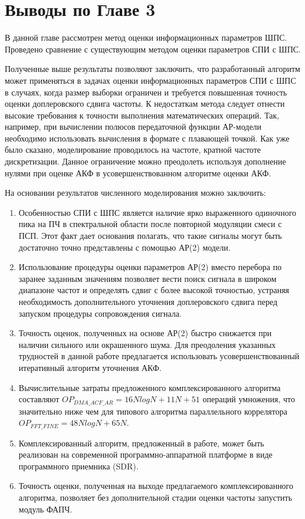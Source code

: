\section{Выводы по Главе 3}

В данной главе рассмотрен метод оценки информационных параметров ШПС. Проведено сравнение с существующим методом оценки параметров СПИ с ШПС.

Полученные выше результаты позволяют заключить, что разработанный алгоритм может применяться в задачах оценки информационных параметров СПИ с ШПС в случаях, когда размер выборки ограничен и
требуется повышенная точность оценки доплеровского сдвига частоты. К недостаткам метода следует отнести высокие требования к точности выполнения математических операций.
Так, например, при вычислении полюсов передаточной функции АР-модели необходимо использовать вычисления в формате с плавающей точкой. 
Как уже было сказано, моделирование проводилось на частоте, кратной частоте дискретизации. Данное ограничение можно преодолеть используя дополнение нулями при оценке АКФ
в усовершенствованном алгоритме оценки АКФ.

На основании результатов численного моделирования можно заключить:
\begin{enumerate}
\item Особенностью СПИ с ШПС является наличие ярко выраженного одиночного пика на ПЧ в спектральной области после повторной модуляции смеси с ПСП.
	Этот факт дает основания полагать, что такие сигналы могут быть достаточно точно представлены с помощью АР(2) модели.
\item Использование процедуры оценки параметров АР(2) вместо перебора по заранее заданным значениям позволяет вести поиск сигнала в широком диапазоне частот и определять сдвиг
	с более высокой точностью, устраняя необходимость дополнительного уточнения доплеровского сдвига перед запуском процедуры сопровождения сигнала.
\item Точность оценок, полученных на основе АР(2) быстро снижается при наличии сильного или окрашенного шума. Для преодоления указанных трудностей в 
	данной работе предлагается использовать усовершенствованный итеративный алгоритм уточнения АКФ.
\item Вычислительные затраты предложенного комплексированного алгоритма составляют ${OP_{DMA\_ACF\_AR} = 16NlogN + 11N + 51}$  операций умножения, что значительно ниже чем  для
	типового алгоритма параллельного коррелятора ${OP_{FFT\_FINE} = 48NlogN + 65N}$.
\item Комплексированный алгоритм, предложенный в работе, может быть реализован на современной программно-аппаратной платформе в виде программного приемника (SDR). 
\item Точность оценки, полученная на выходе предлагаемого комплексированного алгоритма, позволяет без дополнительной стадии оценки частоты запустить модуль ФАПЧ.
\end{enumerate}

\clearpage
